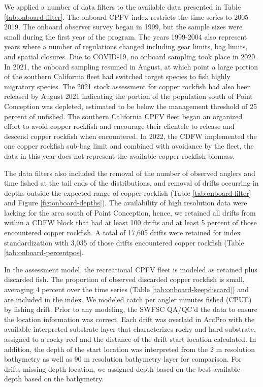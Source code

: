 \documentclass[11pt,
  english,
  letterpaper,
]{article}
\begin{document}
We applied a number of data filters to the available data presented in Table \ref{tab:onboard-filter}. The onboard CPFV index restricts the time series to 2005-2019. The onboard observer survey began in 1999, but the sample sizes were small during the first year of the program. The years 1999-2004 also represent years where a number of regulations changed including gear limits, bag limits, and spatial closures. Due to COVID-19, no onboard sampling took place in 2020. In 2021, the onboard sampling resumed in August, at which point a large portion of the southern California fleet had switched target species to fish highly migratory species. The 2021 stock assessment for copper rockfish had also been released by August 2021 indicating the portion of the population south of Point Conception was depleted, estimated to be below the management threshold of 25 percent of unfished. The southern California CPFV fleet began an organized effort to avoid copper rockfish and encourage their clientele to release and descend copper rockfish when encountered. In 2022, the CDFW implemented the one copper rockfish sub-bag limit and combined with avoidance by the fleet, the data in this year does not represent the available copper rockfish biomass.

The data filters also included the removal of the number of observed anglers and time fished at the tail ends of the distributions, and removal of drifts occurring in depths outside the expected range of copper rockfish (Table \ref{tab:onboard-filter} and Figure \ref{fig:onboard-depths}). The availability of high resolution data were lacking for the area south of Point Conception, hence, we retained all drifts from within a CDFW block that had at least 100 drifts and at least 5 percent of those encountered copper rockfish. A total of 17,605 drifts were retained for index standardization with 3,035 of those drifts encountered copper rockfish (Table \ref{tab:onboard-percentpos}.

In the assessment model, the recreational CPFV fleet is modeled as retained plus discarded fish. The proportion of observed discarded copper rockfish is small, averaging 4 percent over the time series (Table \ref{tab:onboard-keepdiscard}) and are included in the index. We modeled catch per angler minutes fished (CPUE) by fishing drift. Prior to any modeling, the SWFSC QA/QC'd the data to ensure the location information was correct. Each drift was overlaid in ArcPro with the available interpreted substrate layer that characterizes rocky and hard substrate, assigned to a rocky reef and the distance of the drift start location calculated. In addition, the depth of the start location was interpreted from the 2 m resolution bathymetry as well as 90 m resolution bathymetry layer for comparison. For drifts missing depth location, we assigned depth based on the best available depth based on the bathymetry.
\end{document}
